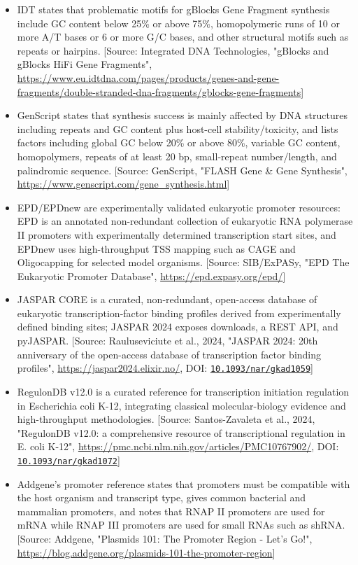 \documentclass[11pt]{report}
\begin{document}
\begin{itemize}
\item IDT states that problematic motifs for gBlocks Gene Fragment synthesis include GC content below 25\% or above 75\%, homopolymeric runs of 10 or more A/T bases or 6 or more G/C bases, and other structural motifs such as repeats or hairpins. [Source: Integrated DNA Technologies, "gBlocks and gBlocks HiFi Gene Fragments", \url{https://www.eu.idtdna.com/pages/products/genes-and-gene-fragments/double-stranded-dna-fragments/gblocks-gene-fragments}]
\item GenScript states that synthesis success is mainly affected by DNA structures including repeats and GC content plus host-cell stability/toxicity, and lists factors including global GC below 20\% or above 80\%, variable GC content, homopolymers, repeats of at least 20 bp, small-repeat number/length, and palindromic sequence. [Source: GenScript, "FLASH Gene \& Gene Synthesis", \url{https://www.genscript.com/gene_synthesis.html}]
\item EPD/EPDnew are experimentally validated eukaryotic promoter resources: EPD is an annotated non-redundant collection of eukaryotic RNA polymerase II promoters with experimentally determined transcription start sites, and EPDnew uses high-throughput TSS mapping such as CAGE and Oligocapping for selected model organisms. [Source: SIB/ExPASy, "EPD The Eukaryotic Promoter Database", \url{https://epd.expasy.org/epd/}]
\item JASPAR CORE is a curated, non-redundant, open-access database of eukaryotic transcription-factor binding profiles derived from experimentally defined binding sites; JASPAR 2024 exposes downloads, a REST API, and pyJASPAR. [Source: Rauluseviciute et al., 2024, "JASPAR 2024: 20th anniversary of the open-access database of transcription factor binding profiles", \url{https://jaspar2024.elixir.no/}, DOI: \href{https://doi.org/10.1093/nar/gkad1059}{\nolinkurl{10.1093/nar/gkad1059}}]
\item RegulonDB v12.0 is a curated reference for transcription initiation regulation in Escherichia coli K-12, integrating classical molecular-biology evidence and high-throughput methodologies. [Source: Santos-Zavaleta et al., 2024, "RegulonDB v12.0: a comprehensive resource of transcriptional regulation in E. coli K-12", \url{https://pmc.ncbi.nlm.nih.gov/articles/PMC10767902/}, DOI: \href{https://doi.org/10.1093/nar/gkad1072}{\nolinkurl{10.1093/nar/gkad1072}}]
\item Addgene's promoter reference states that promoters must be compatible with the host organism and transcript type, gives common bacterial and mammalian promoters, and notes that RNAP II promoters are used for mRNA while RNAP III promoters are used for small RNAs such as shRNA. [Source: Addgene, "Plasmids 101: The Promoter Region - Let's Go!", \url{https://blog.addgene.org/plasmids-101-the-promoter-region}]

\end{itemize}
\end{document}
